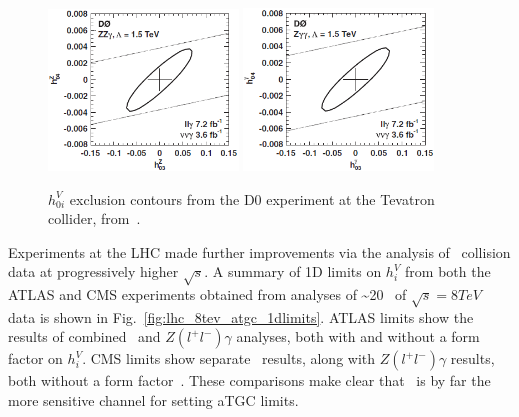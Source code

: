 \documentclass[oneside, letterpaper, 12pt, oldfontcommands]{memoir}
\begin{document}
\begin{figure}[hbtp]
  \begin{center}
    \includegraphics[width=0.45\textwidth]{Figures/d0_ZZg.png}
    \includegraphics[width=0.45\textwidth]{Figures/d0_Zgg.png}
    \caption{
      $h_{0i}^{V}$ exclusion contours from the D0 experiment at the Tevatron collider, from~\cite{ref:PhysRevD.85.052001}.
    }
    \label{fig:d0_aTGC}
  \end{center}
\end{figure}

Experiments at the LHC made further improvements via the analysis of \Pp\Pp\ collision data at progressively higher $\sqrt{s}$.
A summary of 1D limits on $h_{i}^{V}$ from both the ATLAS and CMS experiments obtained from analyses of \textasciitilde20 \fbinv\ of $\sqrt{s} = 8\unit{TeV}$ data
is shown in Fig.~\ref{fig:lhc_8tev_atgc_1dlimits}. ATLAS limits show the results of combined \zinvg\ and $Z(l^\mathrm{+}l^\mathrm{-})\gamma$
analyses, both with and without a form factor on $h_{i}^{V}$. CMS limits show separate \zinvg\ results, along with $Z(l^\mathrm{+}l^\mathrm{-})\gamma$
results, both without a form factor~\cite{ref:RevModPhys.89.035008}. These comparisons make clear that \zinvg\ is by far
the more sensitive channel for setting aTGC limits.
\end{document}
